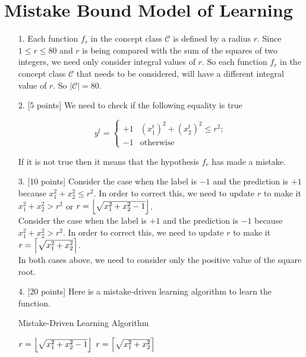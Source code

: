 \section{Mistake Bound Model of Learning}
\begin{enumerate}


\item[1.] Each function $f_r$ in the concept class $\mathcal{C}$ is defined by a radius $r$. Since $1 \leq r \leq 80$ and $r$ is being compared with the sum of the squares of two integers, we need only consider integral values of $r$. So each function  $f_r$ in the concept class $\mathcal{C}$ that needs to be considered, will have a different integral value of $r$. So $|\mathcal{C}| = 80$.
  
\item[2.] [5 points] We need to check if the following equality is true

\begin{equation*}
y^t = \left\{
    \begin{array}{rl}
      +1 & (x_1^t)^2 + (x_2^t)^2 \leq r^2;\\
      -1 & \mbox{otherwise}
    \end{array}
\right.
\label{eq:f_r}
\end{equation*}

If it is not true then it means that the hypothesis $f_r$ has made a mistake.

\item[3.] [10 points] Consider the case when the label is $-1$ and the prediction is $+1$ because $x_1^2 + x_2^2 \leq r^2$. In order to correct this, we need to update $r$ to make it $x_1^2 + x_2^2 > r^2$ or $r = \floor*{\sqrt{x_1^2 + x_2^2 - 1}}$.\\

Consider the case when the label is $+1$ and the prediction is $-1$ because $x_1^2 + x_2^2 > r^2$. In order to correct this, we need to update $r$ to make it $r = \ceil*{\sqrt{x_1^2 + x_2^2}}$.\\

In both cases above, we need to consider only the positive value of the square root.

\item[4.] [20 points] Here is a mistake-driven learning algorithm to learn the function.

\begin{minipage}{\linewidth}
  \begin{algorithm}[H]
    \caption{Mistake-Driven Learning Algorithm}\label{MDLA}
    \begin{algorithmic}[1]
	    \State $r = \floor*{\sqrt{x_1^2 + x_2^2 - 1}}$
	  \EndIf
	\Else 
	   \State $r = \ceil*{\sqrt{x_1^2 + x_2^2}}$
	  \EndIf
	\EndIf
      \EndProcedure
    \end{algorithmic}
  \end{algorithm}
\end{minipage}\\


\end{enumerate}
